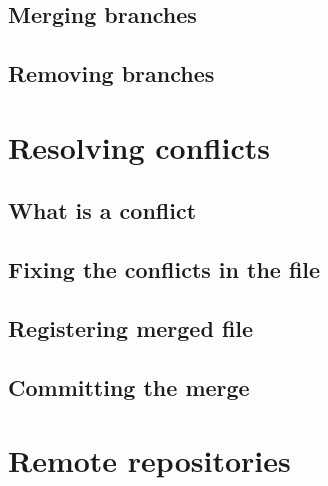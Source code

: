\documentclass[10pt,a4paper]{beamer}
\begin{document}
\subsection{Merging branches}
\begin{frame}

\end{frame}

\subsection{Removing branches}
\begin{frame}

\end{frame}


\section{Resolving conflicts}

\subsection{What is a conflict}
\begin{frame}

\end{frame}

\subsection{Fixing the conflicts in the file}
\begin{frame}

\end{frame}

\subsection{Registering merged file}
\begin{frame}

\end{frame}

\subsection{Committing the merge}
\begin{frame}

\end{frame}


\section{Remote repositories}
\end{document}
